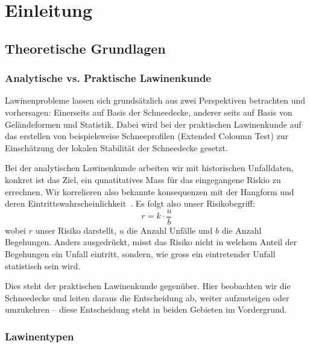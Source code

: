 \section{Einleitung}
\subsection{Theoretische Grundlagen}
\subsubsection{Analytische vs. Praktische Lawinenkunde}
Lawinenprobleme lassen sich grundsätzlich aus zwei Perspektiven betrachten und vorhersagen: Einerseits auf Basis der Schneedecke, anderer seits auf Basis von Geländeformen und Statistik.
Dabei wird bei der praktischen Lawinenkunde auf das erstellen von beispielsweise Schneeprofilen (Extended Coloumn Test) zur Einschätzung der lokalen Stabilität der Schneedecke gesetzt.

Bei der analytischen Lawinenkunde arbeiten wir mit historischen Unfalldaten, konkret ist das Ziel, ein qunatitatives Mass für das eingegangene Riskio zu errechnen.
Wir korrelieren also bekannte konsequenzen mit der Hangform und deren Eintrittswahrscheinlichkeit~\cite{iso_risk}. Es folgt also unser Risikobegriff:
\begin{equation}
  r = k \cdot \frac{u}{b}
\end{equation}
wobei $r$ unser Risiko darstellt, $u$ die Anzahl Unfälle und $b$ die Anzahl Begehungen.
Anders ausgedrückt, misst das Risiko nicht in welchem Anteil der Begehungen ein Unfall eintritt, sondern, wie gross ein eintretender Unfall statistisch sein wird.

Dies steht der praktischen Lawinenkunde gegenüber. Hier beobachten wir die Schneedecke und leiten daraus die Entscheidung ab, weiter aufzusteigen oder umzukehren – diese Entscheidung steht in beiden Gebieten im Vordergrund.
\columnbreak{}

\subsubsection{Lawinentypen}

